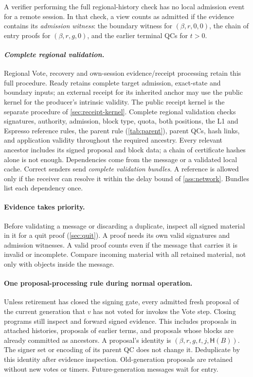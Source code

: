 \documentclass[11pt,a4paper]{article}
\newcommand{\Hash}{\mathsf H}
\newcommand{\defterm}[1]{\textcolor{rrBlue}{\textit{#1}}}
\begin{document}
A verifier performing the full regional-history check has no local
admission event for a remote session. In that check, a view counts as
admitted if the evidence contains
its \defterm{admission witness}: the boundary witness for $(\beta,r,0,0)$, the chain of
entry proofs for $(\beta,r,g,0)$, and the earlier terminal QCs for $t>0$.

\paragraph{\defterm{Complete regional validation.}}
Regional Vote, recovery and own-session evidence/receipt processing
retain this full procedure. Ready retains complete target admission,
exact-state and boundary inputs; an external receipt for its inherited
anchor may use the public kernel for the producer's intrinsic validity.
The public receipt kernel is the separate procedure of
\cref{sec:receipt-kernel}. Complete regional validation checks signatures, authority, admission, block type, quota,
both positions, the L1 and Espresso reference rules, the parent rule
(\cref{tab:parent}), parent QCs, hash links, and application validity
throughout the required ancestry. Every relevant ancestor includes its
signed proposal and block data; a chain of certificate hashes alone is
not enough. Dependencies come from the message or a validated local
cache. Correct senders send \defterm{complete validation bundles}. A reference is
allowed only if the receiver can resolve it within the delay bound of
\cref{ass:network}. Bundles list each dependency once.

\paragraph{Evidence takes priority.}
Before validating a message or discarding a duplicate, inspect all signed
material in it for a quit proof (\cref{sec:quit}). A proof needs its own
valid signatures and admission witnesses. A valid proof counts even if
the message that carries it is invalid or incomplete. Compare incoming
material with all retained material, not only with objects inside the
message.

\paragraph{One proposal-processing rule during normal operation.}
Unless retirement has closed the signing gate, every admitted fresh
proposal of the current generation that $v$ has not voted for invokes the
Vote step. Closing programs still inspect and forward signed evidence. This includes proposals in attached
histories, proposals of earlier terms, and proposals whose blocks are
already committed as ancestors. A proposal's identity is
$(\beta,r,g,t,j,\Hash(B))$. The signer set or encoding of its parent QC does
not change it. Deduplicate by this identity after evidence inspection.
Old-generation proposals are retained without new votes or timers.
Future-generation messages wait for entry.
\end{document}
